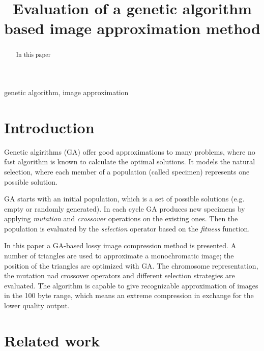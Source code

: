 \documentclass[conference]{IEEEtran}
\begin{document}
\title{Evaluation of a genetic algorithm based image approximation method}

\author{
}

\maketitle

\begin{abstract}
In this paper
\end{abstract}

\begin{IEEEkeywords}
genetic algorithm, image approximation
\end{IEEEkeywords}

\section{Introduction}

Genetic algirithms (GA) \cite{ga-book} offer good approximations to many
problems, where no fast algorithm is known to calculate
the optimal solutions. It models the natural selection,
where each member of a population (called specimen)
represents one possible solution.

GA starts with an initial population, which is a set of
possible solutions (e.g. empty or randomly generated).
In each cycle GA produces new specimens by applying
\emph{mutation} and \emph{crossover} operations on the
existing ones. Then the population is evaluated by
the \emph{selection} operator based on the \emph{fitness}
function.

In this paper a GA-based lossy image compression method is
presented. A number of triangles are used to approximate
a monochromatic image; the position of the triangles are
optimized with GA. The chromosome representation, the
mutation nad crossover operators and different selection
strategies are evaluated. The algorithm is capable to give
recognizable approximation of images in the 100 byte range,
which means an extreme compression in exchange for the
lower quality output.

\section{Related work}
\end{document}

